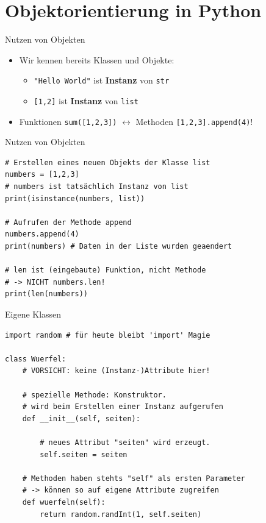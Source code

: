 \section{Objektorientierung in Python}
\begin{frame}{Nutzen von Objekten}
    \begin{itemize}
        \item Wir kennen bereits Klassen und Objekte:
        \begin{itemize}
            \item \texttt{"Hello World"} ist \textbf{Instanz} von \texttt{str}
            \item \texttt{[1,2]} ist \textbf{Instanz} von \texttt{list}
        \end{itemize}
        \item Funktionen \texttt{sum([1,2,3])} $\leftrightarrow$ Methoden \texttt{[1,2,3].append(4)}!
    \end{itemize} 
\end{frame}

\begin{frame}[fragile]{Nutzen von Objekten}
\begin{lstlisting}
# Erstellen eines neuen Objekts der Klasse list
numbers = [1,2,3]
# numbers ist tatsächlich Instanz von list
print(isinstance(numbers, list))

# Aufrufen der Methode append
numbers.append(4)
print(numbers) # Daten in der Liste wurden geaendert

# len ist (eingebaute) Funktion, nicht Methode
# -> NICHT numbers.len!
print(len(numbers))
\end{lstlisting}
\end{frame}

\begin{frame}[fragile]{Eigene Klassen}
\begin{lstlisting}
import random # für heute bleibt 'import' Magie

class Wuerfel:
    # VORSICHT: keine (Instanz-)Attribute hier!

    # spezielle Methode: Konstruktor. 
    # wird beim Erstellen einer Instanz aufgerufen
    def __init__(self, seiten):

        # neues Attribut "seiten" wird erzeugt.
        self.seiten = seiten

    # Methoden haben stehts "self" als ersten Parameter
    # -> können so auf eigene Attribute zugreifen
    def wuerfeln(self):
        return random.randInt(1, self.seiten)
\end{lstlisting}
\end{frame}

